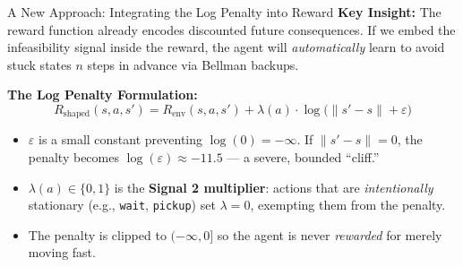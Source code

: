 \documentclass[11pt,aspectratio=169]{beamer}
\begin{document}
\begin{frame}{A New Approach: Integrating the Log Penalty into Reward}
    \textbf{Key Insight:} The reward function already encodes discounted future consequences. If we embed the infeasibility signal inside the reward, the agent will \textit{automatically} learn to avoid stuck states $n$ steps in advance via Bellman backups.

    \vspace{0.2cm}
    \textbf{The Log Penalty Formulation:}
    \begin{equation}
        R_{\text{shaped}}(s, a, s') = R_{\text{env}}(s, a, s') + \lambda(a) \cdot \log\bigl(\|s' - s\| + \varepsilon\bigr)
    \end{equation}

    \begin{itemize}
        \item $\varepsilon$ is a small constant preventing $\log(0) = -\infty$. If $\|s'-s\| = 0$, the penalty becomes $\log(\varepsilon) \approx -11.5$ — a severe, bounded ``cliff.''
        \item $\lambda(a) \in \{0, 1\}$ is the \textbf{Signal 2 multiplier}: actions that are \textit{intentionally} stationary (e.g., \texttt{wait}, \texttt{pickup}) set $\lambda = 0$, exempting them from the penalty.
        \item The penalty is clipped to $(-\infty, 0]$ so the agent is never \textit{rewarded} for merely moving fast.
    \end{itemize}
\end{frame}
\end{document}
